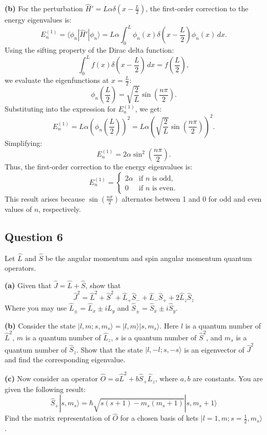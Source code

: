 \documentclass{article}
\begin{document}
\textbf{(b)} For the perturbation \(\hat{H}' = L \alpha \delta\left(x - \frac{L}{2}\right)\), the first-order correction to the energy eigenvalues is:
\[
E_n^{(1)} = \langle \phi_n | \hat{H}' | \phi_n \rangle = L \alpha \int_0^L \phi_n(x) \delta\left(x - \frac{L}{2}\right) \phi_n(x) \, dx.
\]
Using the sifting property of the Dirac delta function:
\[
\int_0^L f(x) \delta\left(x - \frac{L}{2}\right) \, dx = f\left(\frac{L}{2}\right),
\]
we evaluate the eigenfunctions at \(x = \frac{L}{2}\):
\[
\phi_n\left(\frac{L}{2}\right) = \sqrt{\frac{2}{L}} \sin\left(\frac{n \pi}{2}\right).
\]
Substituting into the expression for \(E_n^{(1)}\), we get:
\[
E_n^{(1)} = L \alpha \left(\phi_n\left(\frac{L}{2}\right)\right)^2 = L \alpha \left(\sqrt{\frac{2}{L}} \sin\left(\frac{n \pi}{2}\right)\right)^2.
\]
Simplifying:
\[
E_n^{(1)} = 2 \alpha \sin^2\left(\frac{n \pi}{2}\right).
\]
Thus, the first-order correction to the energy eigenvalues is:
\[
E_n^{(1)} = 
\begin{cases}
2 \alpha & \text{if } n \text{ is odd}, \\
0 & \text{if } n \text{ is even}.
\end{cases}
\]
This result arises because \(\sin\left(\frac{n \pi}{2}\right)\) alternates between 1 and 0 for odd and even values of \(n\), respectively.

\subsection{Question 6}

Let \(\hat{L}\) and \(\hat{S}\) be the angular momentum and spin angular momentum quantum operators.

\textbf{(a)} Given that \(\hat{J} = \hat{L} + \hat{S}\), show that
\[
\hat{J}^2 = \hat{L}^2 + \hat{S}^2 + \hat{L}_+ \hat{S}_- + \hat{L}_- \hat{S}_+ + 2 \hat{L}_z \hat{S}_z
\]
Where you may use \(\hat{L}_\pm = \hat{L}_x \pm i \hat{L}_y\) and \(\hat{S}_\pm = \hat{S}_x \pm i \hat{S}_y\).

\textbf{(b)} Consider the state \(|l, m; s, m_s\rangle = |l, m\rangle |s, m_s\rangle\). Here \(l\) is a quantum number of \(\hat{L}^2\), \(m\) is a quantum number of \(\hat{L}_z\), \(s\) is a quantum number of \(\hat{S}^2\), and \(m_s\) is a quantum number of \(\hat{S}_z\). Show that the state \(|l, -l; s, -s\rangle\) is an eigenvector of \(\hat{J}^2\) and find the corresponding eigenvalue.

\textbf{(c)} Now consider an operator \(\hat{O} = a \hat{L}^2 + b \hat{S}_+ \hat{L}_z\), where \(a, b\) are constants. You are given the following result:
\[
\hat{S}_+ |s, m_s\rangle = \hbar \sqrt{s(s+1) - m_s(m_s + 1)} |s, m_s + 1\rangle
\]
Find the matrix representation of \(\hat{O}\) for a chosen basis of kets \(|l = 1, m; s = \frac{1}{2}, m_s\rangle\).
\end{document}
